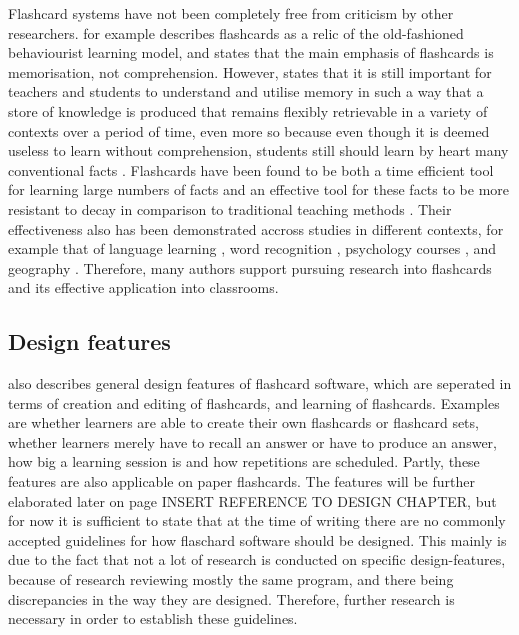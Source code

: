 Flashcard systems have not been completely free from criticism by other researchers.  for example describes flashcards as a relic of the old-fashioned behaviourist learning model, and  states that the main emphasis of flashcards is memorisation, not comprehension. However,  states that it is still important for teachers and students to understand and utilise memory in such a way that a store of knowledge is produced that remains flexibly retrievable in a variety of contexts over a period of time, even more so because even though it is deemed useless to learn without comprehension, students still should learn by heart many conventional facts \cite{glaserfield}. Flashcards have been found to be both a time efficient tool for learning large numbers of facts and an effective tool for these facts to be more resistant to decay in comparison to traditional teaching methods \cite{nakata}. Their effectiveness also has been demonstrated accross studies in different contexts, for example that of language learning \cite{chien, macquarrie, mccullough, nakata}, word recognition \cite{joseph}, psychology courses \cite{burgess, golding}, and geography \cite{zirkle}. Therefore, many authors support pursuing research into flashcards and its effective application into classrooms.

\subsection{Design features}

 also describes general design features of flashcard software, which are seperated in terms of creation and editing of flashcards, and learning of flashcards. Examples are whether learners are able to create their own flashcards or flashcard sets, whether learners merely have to recall an answer or have to produce an answer, how big a learning session is and how repetitions are scheduled. Partly, these features are also applicable on paper flashcards. The features will be further elaborated later on page INSERT REFERENCE TO DESIGN CHAPTER, but for now it is sufficient to state that at the time of writing there are no commonly accepted guidelines for how flaschard software should be designed. This mainly is due to the fact that not a lot of research is conducted on specific design-features, because of research reviewing mostly the same program, and there being discrepancies in the way they are designed. Therefore, further research is necessary in order to establish these guidelines.

